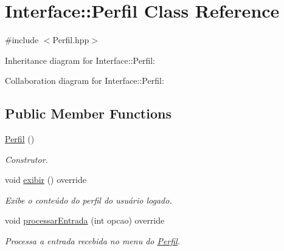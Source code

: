 \hypertarget{class_interface_1_1_perfil}{}\section{Interface\+:\+:Perfil Class Reference}
\label{class_interface_1_1_perfil}


{\ttfamily \#include $<$Perfil.\+hpp$>$}



Inheritance diagram for Interface\+:\+:Perfil\+:


Collaboration diagram for Interface\+:\+:Perfil\+:
\subsection*{Public Member Functions}
\begin{DoxyCompactItemize}
\item 
\hyperlink{class_interface_1_1_perfil_a0292281cafc561ce75d94bcba59a9772}{Perfil} ()
\begin{DoxyCompactList}\small\item\em Construtor. \end{DoxyCompactList}\item 
void \hyperlink{class_interface_1_1_perfil_a29d31d3c2daa82a7b67a24f061b4547c}{exibir} () override
\begin{DoxyCompactList}\small\item\em Exibe o conteúdo do perfil do usuário logado. \end{DoxyCompactList}\item 
void \hyperlink{class_interface_1_1_perfil_a699f6dc5e49e072288f2fde2c220a0fc}{processar\+Entrada} (int opcao) override
\begin{DoxyCompactList}\small\item\em Processa a entrada recebida no menu do \hyperlink{class_interface_1_1_perfil}{Perfil}. \end{DoxyCompactList}\end{DoxyCompactItemize}

